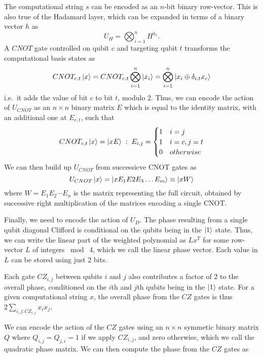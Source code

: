 The computational string $s$ can be encoded as an $n$-bit binary row-vector. This is also true of the Hadamard layer, which can be expanded in terms of a binary vector $h$ as
\begin{equation}
U_{H} = \bigotimes_{i=1}^{n} H^{h_{i}}.
\label{eq:binaryhad}
\end{equation}
A $CNOT$ gate controlled on qubit $c$ and targeting qubit $t$ transforms the computational basis states as
\[
CNOT_{c,t}\ket{x} = CNOT_{c,t}\bigotimes_{i=1}^{n}\ket{x_{i}} = \bigotimes_{i=1}^{n}\ket{x_{i}\oplus\delta_{i,t}x_{c}}
\]
i.e.~it adds the value of bit $c$ to bit $t$, modulo $2$. Thus, we can encode the action of $U_{CNOT}$ as an $n\times n$ binary matrix $E$ which is equal to the identity matrix, with an additional one at $E_{c,t}$, such that
\begin{equation}
CNOT_{c,t}\ket{x} = \ket{xE}\;:\; E_{i,j}=\begin{cases} 1 & i=j\\ 1 & i=c, j=t \\ 0 & otherwise \end{cases}
\label{eq:cnot_matrix}
\end{equation}
We can then build up $U_{CNOT}$ from successicve CNOT gates as
\begin{equation}
U_{CNOT}\ket{x} = \ket{x E_{1}E{2}E_{3}\dots E_{m}} \equiv \ket{xW} \label{eq:cnot_matrices}
\end{equation}
where $W=E_{1}E_{2}\cdots E_{n}$ is the matrix representing the full circuit, obtained by successive right multiplication of the matrices encoding a single CNOT.\par
Finally, we need to encode the action of $U_{D}$. The phase resulting from a single qubit diagonal Clifford is conditional on the qubits being in the $\ket{1}$ state. Thus, we can write the linear part of the weighted polynomial as $Lx^{T}$ for some row-vector $L$ of integers $\bmod\;4$, which we call the linear phase vector. Each value in $L$ can be stored using just 2 bits.\par 
Each gate $CZ_{i,j}$ between qubits $i$ and $j$ also contributes a factor of $2$ to the overall phase, conditioned on the $i$th and $j$th qubits being in the $\ket{1}$ state. For a given computational string $x$, the overall phase from the $CZ$ gates is thus $2\sum_{i,j : CZ_{i,j}} x_{i}x_{j}$.\par
We can encode the action of the $CZ$ gates using an $n\times n$ symmetic binary matrix $Q$ where $Q_{i,j}=Q_{j,i}=1$ if we apply $CZ_{i,j}$, and zero otherwise, which we call the quadratic phase matrix. We can then compute the phase from the $CZ$ gates as
